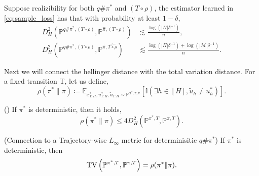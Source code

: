 \documentclass{article}
\begin{document}
\begin{proposition}\label{prop:hellinger_bound_instance}
Suppose realizibility for both $q\#\pi^*$ and $(T\circ \rho)$, 
    the estimator learned in \cref{eq:sample_loss} has that with probability at least $1-\delta$,
    \begin{align*}
        D_H^2\left(\mathbb P^{q\#\pi^*,(T\circ \rho)},\mathbb P^{\hat \pi, (T\circ \rho)}\right)&\lesssim \frac{\log (|\Pi|\delta^{-1})}{n},\\
        D_H^2\left(\mathbb P^{q\#\pi^*, (T\circ \rho)},\mathbb P^{\hat \pi, \widehat{T\circ \rho}}\right)&\lesssim \frac{\log(|\Pi|\delta^{-1})+\log(|\mathcal M|\delta^{-1})}{n}.
    \end{align*}
\end{proposition}

Next we will connect the hellinger distance with the total variation distance. For a fixed transition T, let us define,
\begin{equation*}
    \rho(\pi^*\| \pi)\coloneqq \mathbb E_{x^*_{1:H},u_{1:H}^*, \tilde u_{1:H}\sim \mathbb P^{\pi^*, T, \pi}}
    [\mathbb I(\exists h\in [H], \tilde u_h\neq u_h^*)].
\end{equation*}



\begin{lemma}\textnormal{(\citealp{foster2024behavior})}
    If $\pi^*$ is deterministic, then it holds,
    \begin{equation*}
        \rho(\pi^*\|\pi)\leq 4 D_H^2(\mathbb P^{\pi^*, T}, \mathbb P^{\pi,T}).
    \end{equation*}
\end{lemma}


\begin{lemma}\label{lemma:upper_bound_TV_directly_by_hellinger}\textnormal{(Connection to a Trajectory-wise $L_\infty$ metric for determinisitic $q\#\pi^*$)} If $\pi^*$ is deterministic, then
\begin{equation*}
    \textnormal{TV}\left(\mathbb P^{\pi^*, T}, \mathbb P^{\pi, T}\right)=\rho(\pi^*\|\pi).
\end{equation*}
\end{lemma}
\end{document}

